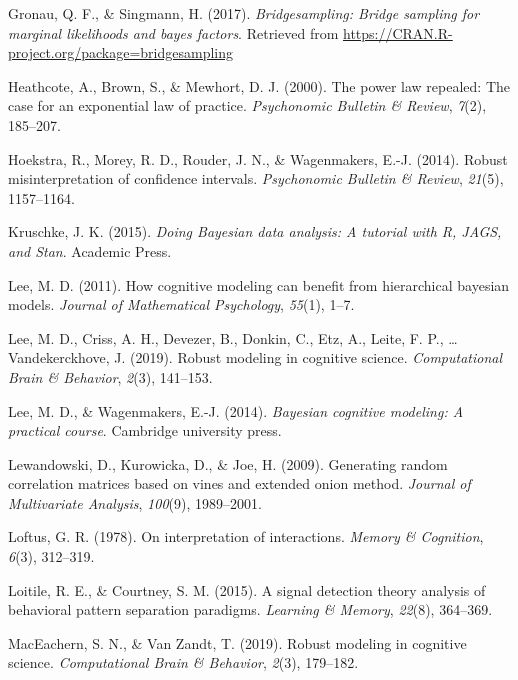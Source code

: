 \documentclass[
  english,
  ,man,floatsintext]{apa6}
\begin{document}
\leavevmode\hypertarget{ref-bridgesampling}{}%
Gronau, Q. F., \& Singmann, H. (2017). \emph{Bridgesampling: Bridge sampling for marginal likelihoods and bayes factors}. Retrieved from \url{https://CRAN.R-project.org/package=bridgesampling}

\leavevmode\hypertarget{ref-heathcote2000power}{}%
Heathcote, A., Brown, S., \& Mewhort, D. J. (2000). The power law repealed: The case for an exponential law of practice. \emph{Psychonomic Bulletin \& Review}, \emph{7}(2), 185--207.

\leavevmode\hypertarget{ref-HoekstraEtAl2014}{}%
Hoekstra, R., Morey, R. D., Rouder, J. N., \& Wagenmakers, E.-J. (2014). Robust misinterpretation of confidence intervals. \emph{Psychonomic Bulletin \& Review}, \emph{21}(5), 1157--1164.

\leavevmode\hypertarget{ref-Kruschke2015}{}%
Kruschke, J. K. (2015). \emph{Doing Bayesian data analysis: A tutorial with R, JAGS, and Stan}. Academic Press.

\leavevmode\hypertarget{ref-lee2011cognitive}{}%
Lee, M. D. (2011). How cognitive modeling can benefit from hierarchical bayesian models. \emph{Journal of Mathematical Psychology}, \emph{55}(1), 1--7.

\leavevmode\hypertarget{ref-LeeEtAl2019}{}%
Lee, M. D., Criss, A. H., Devezer, B., Donkin, C., Etz, A., Leite, F. P., \ldots{} Vandekerckhove, J. (2019). Robust modeling in cognitive science. \emph{Computational Brain \& Behavior}, \emph{2}(3), 141--153.

\leavevmode\hypertarget{ref-lee2014bayesian}{}%
Lee, M. D., \& Wagenmakers, E.-J. (2014). \emph{Bayesian cognitive modeling: A practical course}. Cambridge university press.

\leavevmode\hypertarget{ref-lewandowski2009generating}{}%
Lewandowski, D., Kurowicka, D., \& Joe, H. (2009). Generating random correlation matrices based on vines and extended onion method. \emph{Journal of Multivariate Analysis}, \emph{100}(9), 1989--2001.

\leavevmode\hypertarget{ref-Loftus1978}{}%
Loftus, G. R. (1978). On interpretation of interactions. \emph{Memory \& Cognition}, \emph{6}(3), 312--319.

\leavevmode\hypertarget{ref-LoitileAndCourtney2015}{}%
Loitile, R. E., \& Courtney, S. M. (2015). A signal detection theory analysis of behavioral pattern separation paradigms. \emph{Learning \& Memory}, \emph{22}(8), 364--369.

\leavevmode\hypertarget{ref-MacEachernAndVanZandt2019}{}%
MacEachern, S. N., \& Van Zandt, T. (2019). Robust modeling in cognitive science. \emph{Computational Brain \& Behavior}, \emph{2}(3), 179--182.
\end{document}
